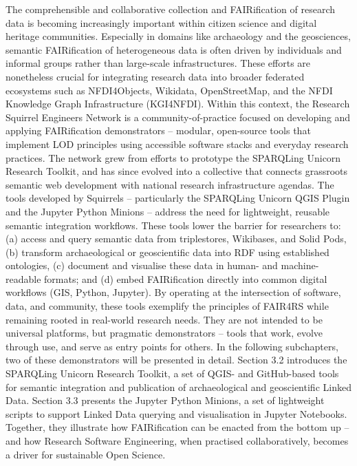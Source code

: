 \documentclass{eceasst}
\begin{document}
The comprehensible and collaborative collection and FAIRification of research data is becoming increasingly important within citizen science and digital heritage communities. Especially in domains like archaeology and the geosciences, semantic FAIRification of heterogeneous data is often driven by individuals and informal groups rather than large-scale infrastructures. These efforts are nonetheless crucial for integrating research data into broader federated ecosystems such as NFDI4Objects, Wikidata, OpenStreetMap, and the NFDI Knowledge Graph Infrastructure (KGI4NFDI). Within this context, the Research Squirrel Engineers Network is a community-of-practice focused on developing and applying FAIRification demonstrators – modular, open-source tools that implement LOD principles using accessible software stacks and everyday research practices. The network grew from efforts to prototype the SPARQLing Unicorn Research Toolkit, and has since evolved into a collective that connects grassroots semantic web development with national research infrastructure agendas. The tools developed by Squirrels  –  particularly the SPARQLing Unicorn QGIS Plugin and the Jupyter Python Minions – address the need for lightweight, reusable semantic integration workflows. These tools lower the barrier for researchers to: (a) access and query semantic data from triplestores, Wikibases, and Solid Pods, (b) transform archaeological or geoscientific data into RDF using established ontologies, (c) document and visualise these data in human- and machine-readable formats; and (d) embed FAIRification directly into common digital workflows (GIS, Python, Jupyter). By operating at the intersection of software, data, and community, these tools exemplify the principles of FAIR4RS while remaining rooted in real-world research needs. They are not intended to be universal platforms, but pragmatic demonstrators – tools that work, evolve through use, and serve as entry points for others. In the following subchapters, two of these demonstrators will be presented in detail. Section 3.2 introduces the SPARQLing Unicorn Research Toolkit, a set of QGIS- and GitHub-based tools for semantic integration and publication of archaeological and geoscientific Linked Data. Section 3.3 presents the Jupyter Python Minions, a set of lightweight scripts to support Linked Data querying and visualisation in Jupyter Notebooks. Together, they illustrate how FAIRification can be enacted from the bottom up – and how Research Software Engineering, when practised collaboratively, becomes a driver for sustainable Open Science.
\end{document}
